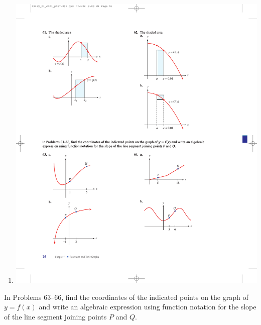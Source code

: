 \documentclass[10pt,]{book}
\theoremstyle{plain}
\theoremstyle{definition}
\theoremstyle{definition}
\theoremstyle{definition}
\theoremstyle{definition}
\numberwithin{equation}{part}
\begin{document}
\begin{exercisegroup}
\begin{multicols}{2}
\begin{enumerate}[label=*\alph**]
\item\hypertarget{li-1089}{}\includegraphics[width=0.8\linewidth]{images/fig-ex-1-4-62b}
%
\end{enumerate}
\end{multicols}
%
\end{exercisegroup}
\par\smallskip\noindent
\hypertarget{exercisegroup-35}{}\par\noindent In Problems 63–66, find the coordinates of the indicated points on the graph of \(y = f (x)\) and write an algebraic expression using function notation for the slope of the line segment joining points \(P\) and \(Q\).%
\end{document}
